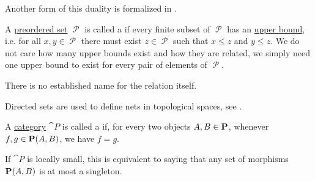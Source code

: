 \begin{definition}
\begin{thmenum}
    Another form of this duality is formalized in .
  \end{thmenum}
\end{definition}

\begin{definition}\label{def:directed_set}
  A \hyperref[def:preordered_set]{preordered set} \( \mscrP \) is called a  if every finite subset of \( \mscrP \) has an \hyperref[def:partially_ordered_set_extremal_points/upper_and_lower_bounds]{upper bound}, i.e. for all \( x, y \in \mscrP \) there must exist \( z \in \mscrP \) such that \( x \leq z \) and \( y \leq z \). We do not care how many upper bounds exist and how they are related, we simply need one upper bound to exist for every pair of elements of \( \mscrP \).

  There is no established name for the relation itself.

  Directed sets are used to define nets in topological spaces, see .
\end{definition}

\begin{definition}\label{def:thin_category}
  A \hyperref[def:category]{category} \( \cat{P} \) is called a  if, for every two objects \( A, B \in \operatorname{\mathbf{P}} \), whenever \( f, g \in \operatorname{\mathbf{P}}(A, B) \), we have \( f = g \).

  If \( \cat{P} \) is locally small, this is equivalent to saying that any set of morphisms \( \operatorname{\mathbf{P}}(A, B) \) is at most a singleton.
\end{definition}


